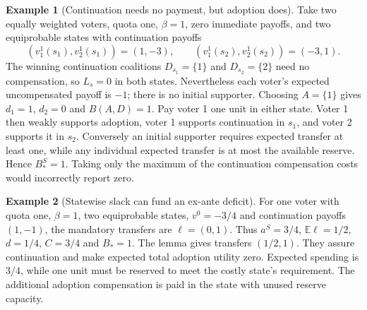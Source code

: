 \documentclass[11pt]{article}
\theoremstyle{definition}
\newtheorem{example}{Example}
\begin{document}
\begin{example}[Continuation needs no payment, but adoption does]
Take two equally weighted voters, quota one, $\beta=1$, zero immediate
payoffs, and two equiprobable states with continuation payoffs
\[
 (v_1^1(s_1),v_2^1(s_1))=(1,-3),\qquad
 (v_1^1(s_2),v_2^1(s_2))=(-3,1).
\]
The winning continuation coalitions $D_{s_1}=\{1\}$ and
$D_{s_2}=\{2\}$ need no compensation, so $L_s=0$ in both states.
Nevertheless each voter's expected uncompensated payoff is $-1$;
there is no initial supporter. Choosing $A=\{1\}$ gives $d_1=1$,
$d_2=0$ and $B(A,D)=1$. Pay voter 1 one unit in either state.
Voter 1 then weakly supports adoption, voter 1 supports continuation
in $s_1$, and voter 2 supports it in $s_2$. Conversely an initial
supporter requires expected transfer at least one, while any individual
expected transfer is at most the available reserve. Hence $B_*^S=1$.
Taking only the maximum of the continuation compensation costs would
incorrectly report zero.
\end{example}

\begin{example}[Statewise slack can fund an ex-ante deficit]
For one voter with quota one, $\beta=1$, two equiprobable states,
$v^0=-3/4$ and continuation payoffs $(1,-1)$, the mandatory transfers
are $\ell=(0,1)$. Thus $a^S=3/4$, $\mathbb E\ell=1/2$,
$d=1/4$, $C=3/4$ and $B_*=1$. The lemma gives transfers $(1/2,1)$.
They assure continuation and make expected total adoption utility zero.
Expected spending is $3/4$, while one unit must be reserved to meet
the costly state's requirement. The additional adoption compensation
is paid in the state with unused reserve capacity.
\end{example}
\end{document}
